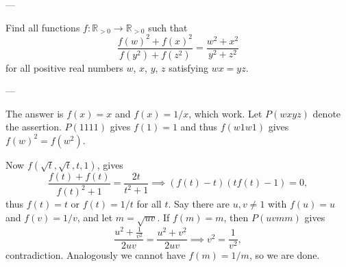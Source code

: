 
---

Find all functions $f:\mathbb R_{>0}\to\mathbb R_{>0}$ such that \[\frac{f(w)^2+f(x)^2}{f(y^2)+f(z^2)}=\frac{w^2+x^2}{y^2+z^2}\]
for all positive real numbers $w$, $x$, $y$, $z$ satisfying $wx=yz$.

---

The answer is $f(x)=x$ and $f(x)=1/x$, which work. Let $P(wxyz)$ denote the assertion. $P(1111)$ gives $f(1)=1$ and thus $f(w1w1)$ gives $f(w)^2=f(w^2)$.

Now $f(\sqrt t,\sqrt t,t,1)$, gives \[\frac{f(t)+f(t)}{f(t)^2+1}=\frac{2t}{t^2+1}\implies\left(f(t)-t\right)\left(tf(t)-1\right)=0,\]
thus $f(t)=t$ or $f(t)=1/t$ for all $t$. Say there are $u,v\ne1$ with $f(u)=u$ and $f(v)=1/v$, and let $m=\sqrt{uv}$. If $f(m)=m$, then $P(uvmm)$ gives \[\frac{u^2+\frac1{v^2}}{2uv}=\frac{u^2+v^2}{2uv}\implies v^2=\frac1{v^2},\]
contradiction. Analogously we cannot have $f(m)=1/m$, so we are done.
